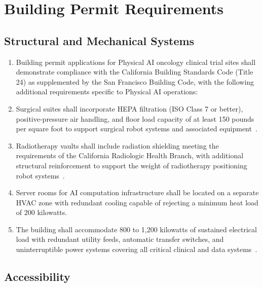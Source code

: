 \documentclass[11pt,letterpaper]{article}
\begin{document}
\section{Building Permit Requirements}

\subsection{Structural and Mechanical Systems}

\begin{enumerate}[label=(\alph*)]
\item Building permit applications for Physical AI oncology clinical trial
  sites shall demonstrate compliance with the California Building Standards
  Code (Title 24) as supplemented by the San Francisco Building Code, with
  the following additional requirements specific to Physical AI operations:

\item Surgical suites shall incorporate HEPA filtration (ISO Class 7 or better),
  positive-pressure air handling, and floor load capacity of at least 150
  pounds per square foot to support surgical robot systems and associated
  equipment~\cite{sitespec2026}.

\item Radiotherapy vaults shall include radiation shielding meeting the
  requirements of the California Radiologic Health Branch, with additional
  structural reinforcement to support the weight of radiotherapy positioning
  robot systems~\cite{sitespec2026}.

\item Server rooms for AI computation infrastructure shall be located on a
  separate HVAC zone with redundant cooling capable of rejecting a minimum
  heat load of 200 kilowatts.

\item The building shall accommodate 800 to 1,200 kilowatts of sustained
  electrical load with redundant utility feeds, automatic transfer switches,
  and uninterruptible power systems covering all critical clinical and
  data systems~\cite{sitespec2026}.
\end{enumerate}

\subsection{Accessibility}
\end{document}
